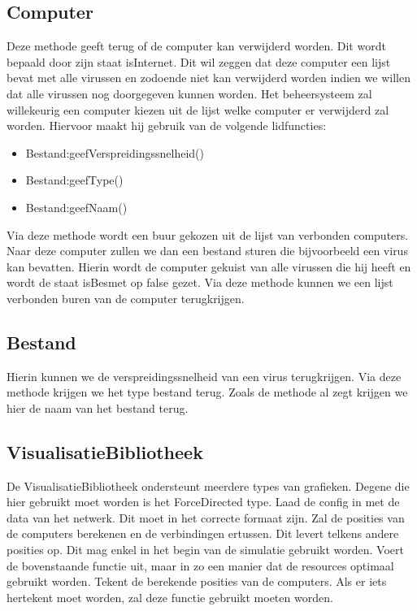 \documentclass[a4paper,oneside]{report}
\begin{document}
\subsection{Computer}
 Deze methode geeft terug of de computer kan verwijderd worden. Dit wordt bepaald door zijn staat isInternet. Dit wil zeggen dat deze computer een lijst bevat met alle virussen en zodoende niet kan verwijderd worden indien we willen dat alle virussen nog doorgegeven kunnen worden.
 Het beheersysteem zal willekeurig een computer kiezen uit de lijst welke computer er verwijderd zal worden. Hiervoor maakt hij gebruik van de volgende lidfuncties:
\begin{itemize}
    \item Bestand:geefVerspreidingssnelheid()
    \item Bestand:geefType()
    \item Bestand:geefNaam()
\end{itemize}
 Via deze methode wordt een buur gekozen uit de lijst van verbonden computers. Naar deze computer zullen we dan een bestand sturen die bijvoorbeeld een virus kan bevatten.
 Hierin wordt de computer gekuist van alle virussen die hij heeft en wordt de staat isBesmet op false gezet.
 Via deze methode kunnen we een lijst verbonden buren van de computer terugkrijgen.
\subsection{Bestand}
 Hierin kunnen we de verspreidingssnelheid van een virus terugkrijgen.
 Via deze methode krijgen we het type bestand terug.
 Zoals de methode al zegt krijgen we hier de naam van het bestand terug.
\subsection{VisualisatieBibliotheek}
 De VisualisatieBibliotheek ondersteunt meerdere types van grafieken. Degene die hier gebruikt moet worden is het ForceDirected type.
 Laad de config in met de data van het netwerk. Dit moet in het correcte formaat zijn.
 Zal de posities van de computers berekenen en de verbindingen ertussen. Dit levert telkens andere posities op. Dit mag enkel in het begin van de simulatie gebruikt worden.
 Voert de bovenstaande functie uit, maar in zo een manier dat de resources optimaal gebruikt worden.
 Tekent de berekende posities van de computers. Als er iets hertekent moet worden, zal deze functie gebruikt moeten worden.
\end{document}
